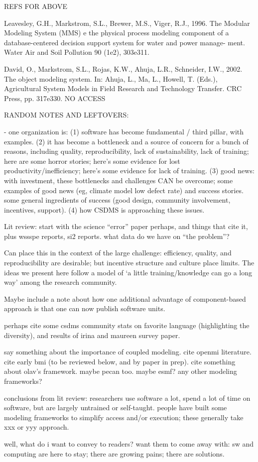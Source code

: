 \documentclass[12pt]{amsart}
\begin{document}
REFS FOR ABOVE

Leavesley, G.H., Markstrom, S.L., Brewer, M.S., Viger, R.J., 1996. The Modular Modeling System (MMS) e the physical process modeling component of a database-centered decision support system for water and power manage-
ment. Water Air and Soil Pollution 90 (1e2), 303e311.

David, O., Markstrom, S.L., Rojas, K.W., Ahuja, L.R., Schneider, I.W., 2002. The object modeling system. In: Ahuja, L., Ma, L., Howell, T. (Eds.), Agricultural System Models in Field Research and Technology Transfer. CRC Press, pp. 317e330. NO ACCESS




RANDOM NOTES AND LEFTOVERS:

- one organization is: (1) software has become fundamental / third pillar, with examples. (2) it has become a bottleneck and a source of concern for a bunch of reasons, including quality, reproducibility, lack of sustainability, lack of training; here are some horror stories; here's some evidence for lost productivity/inefficiency; here's some evidence for lack of training. (3) good news: with investment, these bottlenecks and challenges CAN be overcome; some examples of good news (eg, climate model low defect rate) and success stories. some general ingredients of success (good design, community involvement, incentives, support). (4) how CSDMS is approaching these issues.


Lit review: start with the science ``error'' paper perhaps, and things that cite it, plus wssspe reports, si2 reports. what data do we have on ``the problem''? 

Can place this in the context of the large challenge: efficiency, quality, and reproducibility are desirable; but incentive structure and culture place limits. The ideas we present here follow a model of `a little training/knowledge can go a long way' among the research community.

Maybe include a note about how one additional advantage of component-based approach is that one can now publish software units.

perhaps cite some csdms community stats on favorite language (highlighting the diversity), and results of irina and maureen survey paper.

say something about the importance of coupled modeling. cite openmi literature. cite early bmi (to be reviewed below, and by paper in prep). cite something about olav's framework. maybe pecan too. maybe esmf? any other modeling frameworks?

conclusions from lit review: researchers use software a lot, spend a lot of time on software, but are largely untrained or self-taught. people have built some modeling frameworks to simplify access and/or execution; these generally take xxx or yyy approach.


well, what do i want to convey to readers? want them to come away with: sw and computing are here to stay; there are growing pains; there are solutions. 
\end{document}
